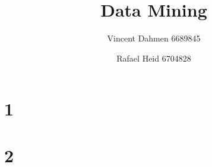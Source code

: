 \documentclass[12pt,a4paper]{article}
\title{Data Mining}
\author{Vincent Dahmen 6689845 \and Rafael Heid 6704828}
\begin{document}
\maketitle{}


\section*{1}

\section*{2}

\end{document}
